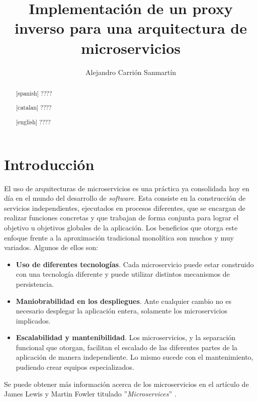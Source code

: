 \documentclass[11pt,spanish,listoffigures]{tfgetsinf}
\title{Implementación de un proxy inverso para una arquitectura de microservicios}
\author{Alejandro Carrión Sanmartín}
\begin{document}

\begin{abstract}[spanish]
????
\end{abstract}
\begin{abstract}[catalan]
????
\end{abstract}
\begin{abstract}[english]
????
\end{abstract}

\mainmatter


\chapter{Introducción}

El uso de arquitecturas de microservicios es una práctica ya consolidada hoy en día en el mundo del desarrollo de \emph{software}. Esta consiste en la construcción de servicios independientes, ejecutados en procesos diferentes, que se encargan de realizar funciones concretas y que trabajan de forma conjunta para lograr el objetivo u objetivos globales de la aplicación. Los beneficios que otorga este enfoque frente a la aproximación tradicional monolítica son muchos y muy variados. Algunos de ellos son:

\begin{itemize}

	\item \textbf{Uso de diferentes tecnologías}.
Cada microservicio puede estar construido con una tecnología diferente y puede utilizar distintos mecanismos de persistencia.

	\item \textbf{Maniobrabilidad en los despliegues}.
Ante cualquier cambio no es necesario desplegar la aplicación entera, solamente los microservicios implicados.

	\item \textbf{Escalabilidad y mantenibilidad}.
Los microservicios, y la separación funcional que otorgan, facilitan el escalado de las diferentes partes de la aplicación de manera independiente. Lo mismo sucede con el mantenimiento, pudiendo crear equipos especializados.

\end{itemize}

Se puede obtener más información acerca de los microservicios en el artículo de James Lewis y Martin Fowler titulado ''\emph{Microservices}'' \cite{LewisAndFowler}.
\end{document}
